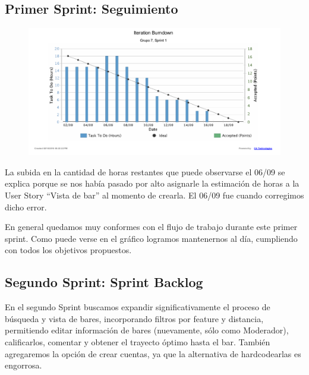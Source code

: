 \subsection{Primer Sprint: Seguimiento}

\begin{figure}[H]
 \centering
  \includegraphics[width=\textwidth]{diagramas/iteration_burndown1.pdf}
  \caption{}
  \label{fig:burndown1}
\end{figure}

La subida en la cantidad de horas restantes que puede observarse el 06/09 se explica porque se nos había pasado por alto asignarle la estimación de horas a la User Story ``Vista de bar'' al momento de crearla. El 06/09 fue cuando corregimos dicho error.

En general quedamos muy conformes con el flujo de trabajo durante este primer sprint. Como puede verse en el gráfico logramos mantenernos al día, cumpliendo con todos los objetivos propuestos.

\subsection{Segundo Sprint: Sprint Backlog}
\par En el segundo Sprint buscamos expandir significativamente el proceso de búsqueda y vista de bares, incorporando filtros por feature y distancia, permitiendo editar información de bares (nuevamente, sólo como Moderador), calificarlos, comentar y obtener el trayecto óptimo hasta el bar.
También agregaremos la opción de crear cuentas, ya que la alternativa de hardcodearlas es engorrosa.


